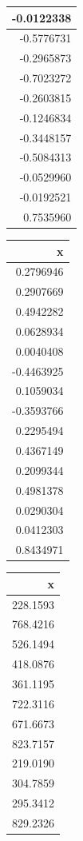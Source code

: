 \documentclass[10pt,dvipsnames,enabledeprecatedfontcommands]{scrartcl}
\begin{document}
\begin{table}
\begin{tabular}[t]{r}
\hline
-0.0122338\\
\hline
-0.5776731\\
\hline
-0.2965873\\
\hline
-0.7023272\\
\hline
-0.2603815\\
\hline
-0.1246834\\
\hline
-0.3448157\\
\hline
-0.5084313\\
\hline
-0.0529960\\
\hline
-0.0192521\\
\hline
0.7535960\\
\hline
\end{tabular}
\centering
\begin{tabular}[t]{r}
\hline
x\\
\hline
0.2796946\\
\hline
0.2907669\\
\hline
0.4942282\\
\hline
0.0628934\\
\hline
0.0040408\\
\hline
-0.4463925\\
\hline
0.1059034\\
\hline
-0.3593766\\
\hline
0.2295494\\
\hline
0.4367149\\
\hline
0.2099344\\
\hline
0.4981378\\
\hline
0.0290304\\
\hline
0.0412303\\
\hline
0.8434971\\
\hline
\end{tabular}
\centering
\begin{tabular}[t]{r}
\hline
x\\
\hline
228.1593\\
\hline
768.4216\\
\hline
526.1494\\
\hline
418.0876\\
\hline
361.1195\\
\hline
722.3116\\
\hline
671.6673\\
\hline
823.7157\\
\hline
219.0190\\
\hline
304.7859\\
\hline
295.3412\\
\hline
829.2326\\

\end{tabular}
\end{table}
\end{document}
